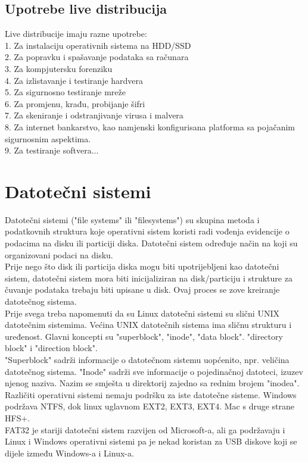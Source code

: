 \documentclass[12pt,vi]{mitthesis}
\begin{document}
\subsection*{Upotrebe live distribucija}
\indent
Live distribucije imaju razne upotrebe:\\
1. Za instalaciju operativnih sistema na HDD/SSD\\
2. Za popravku i spašavanje podataka sa računara\\
3. Za kompjutersku forenziku\\
4. Za izlistavanje i testiranje hardvera\\
5. Za sigurnosno testiranje mreže\\
6. Za promjenu, krađu, probijanje šifri\\
7. Za skeniranje i odstranjivanje virusa i malvera\\
8. Za internet bankarstvo, kao namjenski konfigurisana platforma sa pojačanim sigurnosnim aspektima.\\
9. Za testiranje softvera...\\
\section*{Datotečni sistemi}
\indent
Datotečni sistemi ("file systems" ili "filesystems") su skupina metoda i podatkovnih struktura koje operativni sistem koristi radi vođenja evidencije o podacima na disku ili particiji diska. Datotečni sistem određuje način na koji su organizovani podaci na disku.\\
Prije nego što disk ili particija diska mogu biti upotrijebljeni kao datotečni sistem, datotečni sistem mora biti inicijaliziran na disk/particiju i strukture za čuvanje podataka trebaju biti upisane u disk. Ovaj proces se zove kreiranje datotečnog sistema.\\
Prije svega treba napomenuti da su Linux datotečni sistemi su slični UNIX datotečnim sistemima. Većina UNIX datotečnih sistema ima sličnu strukturu i uređenost. Glavni koncepti su "superblock", "inode", "data block". "directory block" i "direction block".\\
"Superblock" sadrži informacije o datotečnom sistemu uopćenito, npr. veličina datotečnog sistema. "Inode" sadrži sve informacije o pojedinačnoj datoteci, izuzev njenog naziva. Nazim se smješta u direktorij zajedno sa rednim brojem "inodea".\\
Različiti operativni sistemi nemaju podršku za iste datotečne sisteme. Windows podržava NTFS, dok linux uglavnom EXT2, EXT3, EXT4. Mac s druge strane HFS+.\\
FAT32 je stariji datotečni sistem razvijen od Microsoft-a, ali ga podržavaju i Linux i Windows operativni sistemi pa je nekad koristan za USB diskove koji se dijele između Windows-a i Linux-a.
\end{document}
